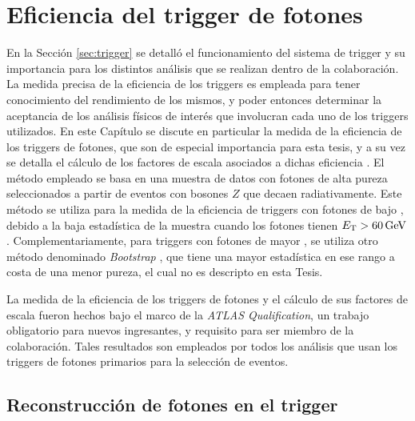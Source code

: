 \chapter{Eficiencia del trigger de fotones}


En la Sección \ref{sec:trigger} se detalló el funcionamiento del sistema de trigger y su importancia para los distintos análisis que se realizan dentro de la colaboración. La medida precisa de la eficiencia de los triggers es empleada para tener conocimiento del rendimiento de los mismos, y poder entonces determinar la aceptancia de los análisis físicos de interés que involucran cada uno de los triggers utilizados. 
En este Capítulo se discute en particular la medida de la eficiencia de los triggers de fotones, que son de especial importancia para esta tesis, y a su vez se detalla el cálculo de los factores de escala asociados a dichas eficiencia . El método empleado se basa en una muestra de datos con fotones de alta pureza seleccionados a partir de eventos con bosones $Z$ que decaen radiativamente. Este método se utiliza para la medida de la eficiencia de triggers con fotones de bajo \ET, debido a la baja estadística de la muestra cuando los fotones tienen $E_{\text{T}}>60\,\text{GeV}$. Complementariamente, para triggers con fotones de mayor \ET, se utiliza otro método denominado \textit{Bootstrap} \cite{tesis_joaco}, que tiene una mayor estadística en ese rango a costa de una menor pureza, el cual no es descripto en esta Tesis.

La medida de la eficiencia de los triggers de fotones y el cálculo de sus factores de escala fueron hechos bajo el marco de la \textit{ATLAS Qualification}, un trabajo obligatorio para nuevos ingresantes, y requisito para ser miembro de la colaboración. Tales resultados son empleados por todos los análisis que usan los triggers de fotones primarios para la selección de eventos.




\section{Reconstrucción de fotones en el trigger}

